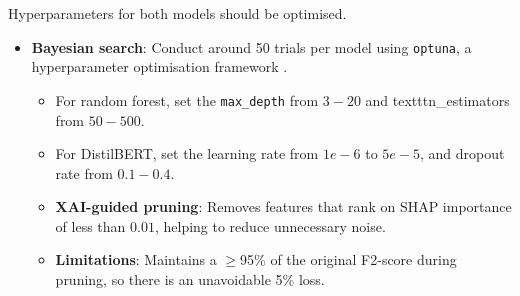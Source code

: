 \noindent Hyperparameters for both models should be optimised.

\begin{itemize}
  \item \textbf{Bayesian search}: Conduct around 50 trials per model using \texttt{optuna}, a hyperparameter optimisation framework \citep{optuna2025}. 
  \begin{itemize}
    \item For random forest, set the \texttt{max\_depth} from $3 - 20$ and texttt{n\_estimators} from $50 - 500$.
    \item For DistilBERT, set the learning rate from $1e - 6$ to $5e - 5$, and dropout rate from $0.1 - 0.4$.
  \item \textbf{XAI-guided pruning}: Removes features that rank on SHAP importance of less than $0.01$, helping to reduce unnecessary noise.
  \item \textbf{Limitations}: Maintains a $\geq$95\% of the original F2-score during pruning, so there is an unavoidable 5\% loss.
  \end{itemize}
\end{itemize}

